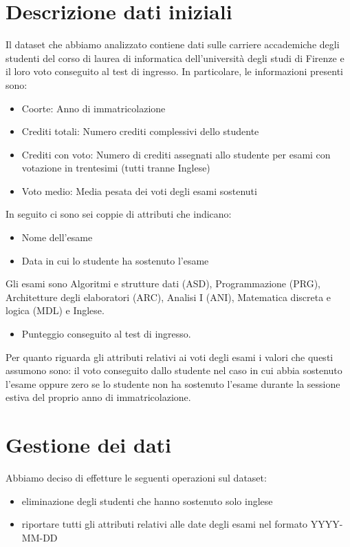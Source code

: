 \documentclass[12pt]{article}
\begin{document}
\section{Descrizione dati iniziali}
Il dataset che abbiamo analizzato contiene dati sulle carriere accademiche degli studenti del corso di laurea di informatica dell'università degli studi di Firenze e il loro voto conseguito 
al test di ingresso. 
In particolare, le informazioni presenti sono:
\begin{itemize}
	\item Coorte: Anno di immatricolazione
	\item Crediti totali: Numero crediti complessivi dello studente
	\item Crediti con voto: Numero di crediti assegnati allo studente per esami con votazione in trentesimi (tutti tranne Inglese)
	\item Voto medio: Media pesata dei voti degli esami sostenuti
\end{itemize}
In seguito ci sono sei coppie di attributi che indicano:
\begin{itemize}
	\item Nome dell'esame
	\item Data in cui lo studente ha sostenuto l'esame
\end{itemize}
Gli esami sono Algoritmi e strutture dati (ASD), Programmazione (PRG), Architetture degli elaboratori (ARC), Analisi I (ANI), Matematica discreta e logica (MDL) e Inglese.
\begin{itemize}
	\item Punteggio conseguito al test di ingresso.
\end{itemize}
Per quanto riguarda gli attributi relativi ai voti degli esami i valori che questi assumono sono:
il voto conseguito dallo studente nel caso in cui abbia sostenuto l'esame oppure
zero se lo studente non ha sostenuto l'esa\-me durante la sessione estiva del proprio anno di immatricolazione.
\newpage
\section{Gestione dei dati}
Abbiamo deciso di effetture le seguenti operazioni sul dataset:
\begin{itemize}
	\item eliminazione degli studenti che hanno sostenuto solo inglese
	\item riportare tutti gli attributi relativi alle date degli esami nel formato YYYY-MM-DD
\end{itemize}
\end{document}
